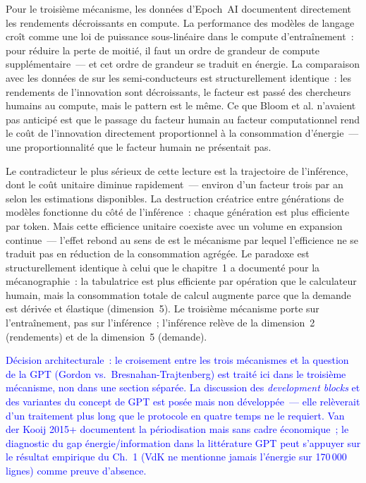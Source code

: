 Pour le troisième mécanisme, les données d'Epoch~AI documentent directement les rendements décroissants en compute. La performance des modèles de langage croît comme une loi de puissance sous-linéaire dans le compute d'entraînement~: pour réduire la perte de moitié, il faut un ordre de grandeur de compute supplémentaire~--- et cet ordre de grandeur se traduit en énergie. La comparaison avec les données de \textcite{bloom_ideas_2020} sur les semi-conducteurs est structurellement identique~: les rendements de l'innovation sont décroissants, le facteur est passé des chercheurs humains au compute, mais le pattern est le même. Ce que Bloom et al. n'avaient pas anticipé est que le passage du facteur humain au facteur computationnel rend le coût de l'innovation directement proportionnel à la consommation d'énergie~--- une proportionnalité que le facteur humain ne présentait pas.

Le contradicteur le plus sérieux de cette lecture est la trajectoire de l'inférence, dont le coût unitaire diminue rapidement~--- environ d'un facteur trois par an selon les estimations disponibles. La destruction créatrice entre générations de modèles fonctionne du côté de l'inférence~: chaque génération est plus efficiente par token. Mais cette efficience unitaire coexiste avec un volume en expansion continue~--- l'effet rebond au sens de \textcite{jevons_coal_1865} est le mécanisme par lequel l'efficience ne se traduit pas en réduction de la consommation agrégée. Le paradoxe est structurellement identique à celui que le chapitre~1 a documenté pour la mécanographie~: la tabulatrice est plus efficiente par opération que le calculateur humain, mais la consommation totale de calcul augmente parce que la demande est dérivée et élastique (dimension~5). Le troisième mécanisme porte sur l'entraînement, pas sur l'inférence~; l'inférence relève de la dimension~2 (rendements) et de la dimension~5 (demande).

\textcolor{blue}{Décision architecturale~: le croisement entre les trois mécanismes et la question de la GPT (Gordon vs.\ Bresnahan-Trajtenberg) est traité ici dans le troisième mécanisme, non dans une section séparée. La discussion des \emph{development blocks} \parencite{nuvolari_understanding_2020} et des variantes du concept de GPT \parencite{freeman_structural_1988} est posée mais non développée~--- elle relèverait d'un traitement plus long que le protocole en quatre temps ne le requiert. Van der Kooij 2015+ documentent la périodisation mais sans cadre économique~; le diagnostic du gap énergie/information dans la littérature GPT peut s'appuyer sur le résultat empirique du Ch.~1 (VdK ne mentionne jamais l'énergie sur 170\,000 lignes) comme preuve d'absence.}


